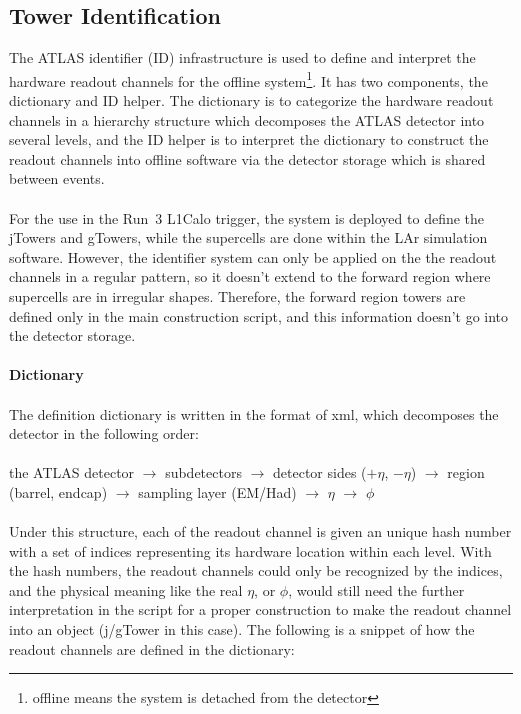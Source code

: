\subsection{Tower Identification}
The ATLAS identifier (ID) infrastructure\cite{Schaffer:684167,Arnault:2003pa} is used to define and interpret the hardware readout channels for the offline system\footnote{offline means the system is detached from the detector}. It has two components, the dictionary and ID helper. The dictionary is to categorize the hardware readout channels in a hierarchy structure which decomposes the ATLAS detector into several levels, and the ID helper is to interpret the dictionary to construct the readout channels into offline software via the detector storage\cite{Calafiura:2003gf} which is shared between events. 
\\
\\For the use in the Run~3 L1Calo trigger, the system is deployed to define the jTowers and gTowers, while the supercells are done within the LAr simulation software. However, the identifier system can only be applied on the the readout channels in a regular pattern, so it doesn't extend to the forward region where supercells are in irregular shapes. Therefore, the forward region towers are defined only in the main construction script, and this information doesn't go into the detector storage\cite{Calafiura:2003gf}. 
\\
\\{\bf Dictionary}
\\
\\The definition dictionary is written in the format of xml, which decomposes the detector in the following order:
\\
\\the ATLAS detector $\to$ subdetectors $\to$ detector sides ($+\eta$, $-\eta$) $\to$ region (barrel, endcap) $\to$ sampling layer (EM/Had) $\to$ $\eta$ $\to$ $\phi$
\\
\\Under this structure, each of the readout channel is given an unique hash number with a set of indices representing its hardware location within each level. With the hash numbers, the readout channels could only be recognized by the indices, and the physical meaning like the real $\eta$, or $\phi$, would still need the further interpretation in the script for a proper construction to make the readout channel into an object (j/gTower in this case). The following is a snippet of how the readout channels are defined in the dictionary:
\\
